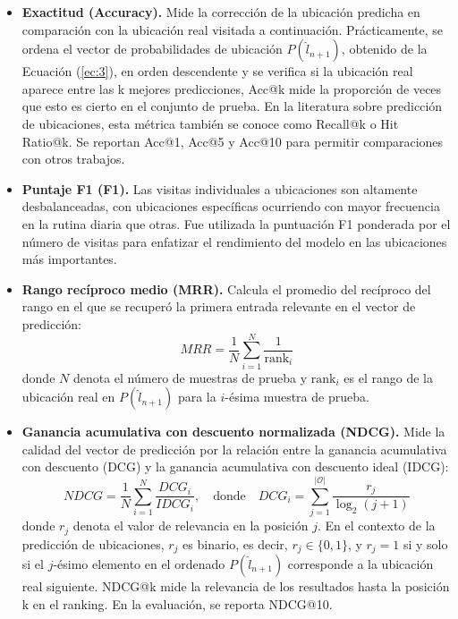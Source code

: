 \begin{itemize}
    \item \textbf{Exactitud (Accuracy).} Mide la correcci\'on de la 
    ubicaci\'on predicha en comparaci\'on con la ubicaci\'on real visitada 
    a continuaci\'on. Pr\'acticamente, se ordena el vector de probabilidades 
    de ubicaci\'on $P (\hat{l}_{n+1})$, obtenido de la Ecuaci\'on (\ref{ec:3}), en orden 
    descendente y se verifica si la ubicaci\'on real aparece entre las 
    k mejores predicciones, Acc@k mide la proporci\'on de veces que esto 
    es cierto en el conjunto de prueba. En la literatura sobre predicci\'on 
    de ubicaciones, esta m\'etrica tambi\'en se conoce como Recall@k 
    o Hit Ratio@k. Se reportan Acc@1, Acc@5 y Acc@10 para permitir 
    comparaciones con otros trabajos.

    \item \textbf{Puntaje F1 (F1).} Las visitas individuales a ubicaciones 
    son altamente desbalanceadas, con ubicaciones espec\'ificas ocurriendo 
    con mayor frecuencia en la rutina diaria que otras. Fue utilizada la 
    puntuaci\'on F1 ponderada por el n\'umero de visitas para enfatizar 
    el rendimiento del modelo en las ubicaciones m\'as importantes.

    \item \textbf{Rango rec\'iproco medio (MRR).} Calcula el promedio del 
    rec\'iproco del rango en el que se recuper\'o la primera entrada 
    relevante en el vector de predicci\'on:
    \begin{equation}
        MRR = \frac{1}{N} \sum_{i=1}^{N} \frac{1}{\text{rank}_i} \tag{5}
    \end{equation}
    donde $N$ denota el n\'umero de muestras de prueba y $\text{rank}_i$ 
    es el rango de la ubicaci\'on real en $P (\hat{l}_{n+1})$ para 
    la $i$-\'esima muestra de prueba.

    \item \textbf{Ganancia acumulativa con descuento normalizada (NDCG).} 
    Mide la calidad del vector de predicci\'on por la relaci\'on entre la 
    ganancia acumulativa con descuento (DCG) y la ganancia acumulativa con 
    descuento ideal (IDCG):
    \begin{equation}
        NDCG = \frac{1}{N} \sum_{i=1}^{N} \frac{DCG_i}{IDCG_i}, 
        \quad \text{donde} \quad DCG_i = \sum_{j=1}^{|\mathcal{O}|} \frac{r_j}{\log_2(j + 1)} \tag{6}
    \end{equation}
    donde $r_j$ denota el valor de relevancia en la posici\'on $j$. 
    En el contexto de la predicci\'on de ubicaciones, $r_j$ es binario, 
    es decir, $r_j \in \{0, 1\}$, y $r_j = 1$ si y solo si el $j$-\'esimo 
    elemento en el ordenado $P (\hat{l}_{n+1})$ corresponde a la 
    ubicaci\'on real siguiente. NDCG@k mide la relevancia de los 
    resultados hasta la posici\'on k en el ranking. En la 
    evaluaci\'on, se reporta NDCG@10.
\end{itemize}
\newpage
